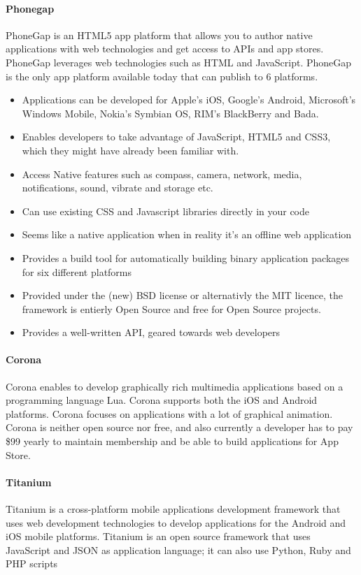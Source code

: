 \paragraph{\bf{Phonegap}}
PhoneGap is an HTML5 app platform that allows you to author native applications with web technologies and get access to APIs and app stores. PhoneGap leverages web technologies such as HTML and JavaScript. PhoneGap is the only app platform available today that can publish to 6 platforms.
\cite{phonegap:about}
	\begin{itemize}
		\item Applications can be developed for Apple’s iOS, Google’s Android,
		Microsoft’s Windows Mobile, Nokia’s Symbian OS, RIM’s BlackBerry and Bada.
		\item Enables developers to take advantage of JavaScript, HTML5 and CSS3,
		which they might have already been familiar with.
		\item Access Native features such as compass, camera, network, media,
		notifications, sound, vibrate and storage etc.
    \item Can use existing CSS and Javascript libraries directly in your code
    \item Seems like a native application when in reality it's an offline web application
    \item Provides a build tool for automatically building binary application packages for six different platforms
    \item Provided under the (new) BSD license or alternativly the MIT licence, the framework is entierly Open Source and free for Open Source projects.
    \item Provides a well-written API, geared towards web developers
	\end{itemize}

\paragraph{Corona}
Corona enables to develop graphically rich multimedia applications based on a programming
language Lua\cite{corona:about}. Corona supports both the iOS and Android platforms. Corona focuses on
applications with a lot of graphical animation. Corona is neither open source nor free, and also currently a developer
has to pay \$99 yearly to maintain membership and be able to build applications for App Store.

\paragraph{Titanium}
Titanium is a cross-platform mobile applications development framework that uses web
development technologies to develop applications for the Android and iOS mobile platforms.
Titanium is an open source framework that uses JavaScript and JSON as application language;
it can also use Python, Ruby and PHP scripts\cite{titanium:about}
